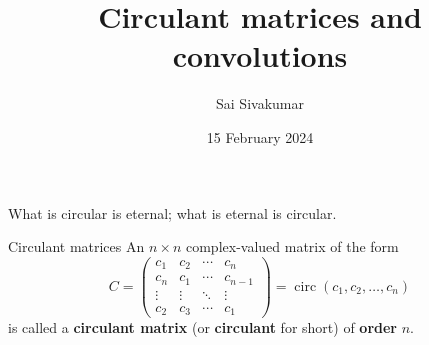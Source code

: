 \documentclass[mathserif
, handout
]{beamer}
\title
{\textcolor{black!85}{Circulant matrices and convolutions}}
\author[Sai Sivakumar]{Sai Sivakumar}
\date{15 February 2024}
\DeclareMathOperator{\Circ}{circ}
\begin{document}
\frame{\titlepage}

\begin{frame}{}
    \begin{center}
        \begin{minipage}{16em}{
            \begin{block}{}
                \centering \Large What is circular is eternal; what is eternal is  circular.
            \end{block}}
        \end{minipage}
    \end{center}
\end{frame}

\begin{frame}{Circulant matrices}
    An $n\times n$ complex-valued matrix of the form \[C = \begin{pmatrix}
        c_1 & c_2 & \cdots & c_n \\
        c_n & c_1 & \cdots & c_{n-1} \\
        \vdots & \vdots & \ddots & \vdots \\
        c_2 & c_3 & \cdots & c_1
    \end{pmatrix} = \Circ(c_1,c_2,\dots,c_n)\] is called a \textbf{circulant matrix} (or \textbf{circulant} for short) of \textbf{order} $n$.
\end{frame}






\end{document}
